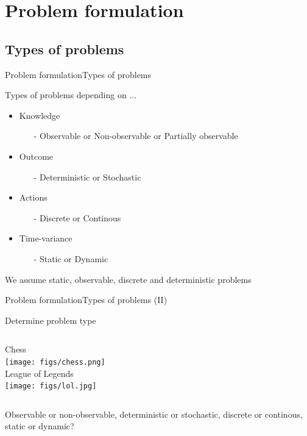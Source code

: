 \documentclass[10pt,compress]{beamer} %
\begin{document}
\section{Problem formulation}
\subsection{Types of problems}
\begin{frame}{Problem formulation}{Types of problems}

    Types of problems depending on ...
	\begin{itemize}
        \item Knowledge
            \begin{itemize}
                \item[-] Observable or Non-observable or Partially observable
            \end{itemize}
        \item Outcome
            \begin{itemize}
                \item[-] Deterministic or Stochastic
            \end{itemize}
        \item Actions
            \begin{itemize}
                \item[-] Discrete or Continous
            \end{itemize}
        \item Time-variance
            \begin{itemize}
                \item[-] Static or Dynamic
            \end{itemize}
	\end{itemize}
    We assume static, observable, discrete and deterministic problems
\end{frame}

\begin{frame}[fragile]{Problem formulation}{Types of problems (II)}
    \begin{exampleblock}{Determine problem type}
       \begin{columns}
           \centering Chess\\
           \medskip
	        \texttt{[image: figs/chess.png]}\\

           \centering League of Legends\\
           \medskip
	        \texttt{[image: figs/lol.jpg]}\\
        \end{columns}
        \medskip
        Observable or non-observable, deterministic or stochastic, discrete or continous, static or dynamic?
    \end{exampleblock}
\end{frame}
\end{document}

